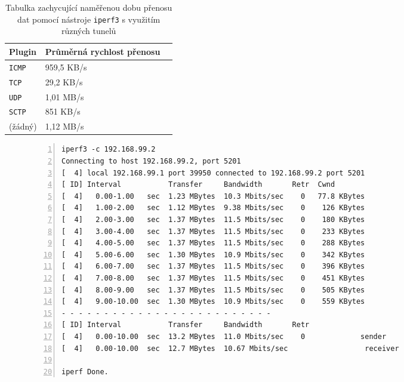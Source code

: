 \documentclass[thesis=M,czech]{FITthesis}[2012/10/20]
\begin{document}
    \begin{table}[h]
	\centering
	\begin{tabular}{|l||l|l|}
	\hline
	Plugin   & Průměrná rychlost přenosu \\ \hline \hline
	\texttt{ICMP}      & 959,5 KB/s                 \\ \hline
	\texttt{TCP}       & 29,2 KB/s                \\ \hline
	\texttt{UDP}       & 1,01 MB/s                 \\ \hline
	\texttt{SCTP}       & 851 KB/s                  \\ \hline
	(žádný)   & 1,12 MB/s                 \\ \hline
	\end{tabular}
	\caption{Tabulka zachycující naměřenou dobu přenosu dat pomocí nástroje \texttt{iperf3} s využitím různých tunelů}
	\label{tab:iperf-download}
    \end{table}
  
  
    \begin{figure}[h]
	\begin{lstlisting}[label=code:iperf,caption=Ukázkový výstup nástroje \texttt{iperf3},frame=single,numbers=left, linewidth=1.1\textwidth]
  iperf3 -c 192.168.99.2
Connecting to host 192.168.99.2, port 5201
[  4] local 192.168.99.1 port 39950 connected to 192.168.99.2 port 5201
[ ID] Interval           Transfer     Bandwidth       Retr  Cwnd
[  4]   0.00-1.00   sec  1.23 MBytes  10.3 Mbits/sec    0   77.8 KBytes       
[  4]   1.00-2.00   sec  1.12 MBytes  9.38 Mbits/sec    0    126 KBytes       
[  4]   2.00-3.00   sec  1.37 MBytes  11.5 Mbits/sec    0    180 KBytes       
[  4]   3.00-4.00   sec  1.37 MBytes  11.5 Mbits/sec    0    233 KBytes       
[  4]   4.00-5.00   sec  1.37 MBytes  11.5 Mbits/sec    0    288 KBytes       
[  4]   5.00-6.00   sec  1.30 MBytes  10.9 Mbits/sec    0    342 KBytes       
[  4]   6.00-7.00   sec  1.37 MBytes  11.5 Mbits/sec    0    396 KBytes       
[  4]   7.00-8.00   sec  1.37 MBytes  11.5 Mbits/sec    0    451 KBytes       
[  4]   8.00-9.00   sec  1.37 MBytes  11.5 Mbits/sec    0    505 KBytes       
[  4]   9.00-10.00  sec  1.30 MBytes  10.9 Mbits/sec    0    559 KBytes       
- - - - - - - - - - - - - - - - - - - - - - - - -
[ ID] Interval           Transfer     Bandwidth       Retr
[  4]   0.00-10.00  sec  13.2 MBytes  11.0 Mbits/sec    0             sender
[  4]   0.00-10.00  sec  12.7 MBytes  10.67 Mbits/sec                  receiver

iperf Done.
      \end{lstlisting}
    \end{figure}
\end{document}
